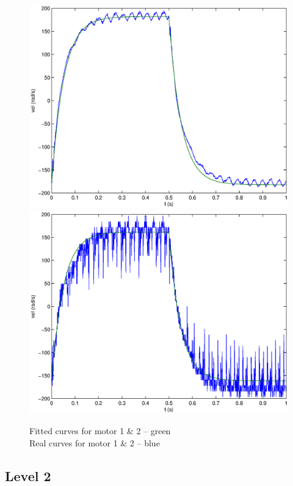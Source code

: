\begin{center}
\begin{figure}[ht]
 \includegraphics[width=\linewidth]{fig/motor1L1.eps}
 \includegraphics[width=\linewidth]{fig/motor2L1.eps}
 \caption{Fitted curves for motor 1 \& 2 -- green \\ Real curves for motor 1 \& 2 -- blue}
 \label{fittedCurves}
\end{figure}
\end{center}

\subsection*{Level 2}

